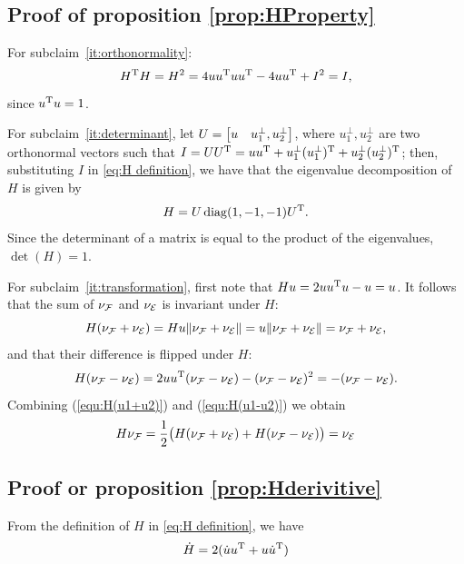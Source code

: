 \documentclass[10pt,twocolumn,twoside]{IEEEtran}
\begin{document}
\appendix
\subsection{Proof of proposition \ref{prop:HProperty}} \label{proof:HProperty}
    For subclaim~\ref{it:orthonormality}:
    \begin{equation}
      H^\mathrm{T} H=H^2=4uu^\mathrm{T} u u^\mathrm{T} - 4uu^\mathrm{T} +I^2=I,
    \end{equation}
    since $u^\mathrm{T} u=1$.

    For subclaim~\ref{it:determinant}, let $U=\begin{bmatrix}u & u^\bot_{1},u^\bot_{2}\end{bmatrix}$, where $u^\bot_{1},u^\bot_{2}$ are two orthonormal vectors such that $I=UU^\mathrm{T}=uu^\mathrm{T} + u^\bot_{1}(u^\bot_{1})^\mathrm{T}+u^\bot_{2}(u^\bot_{2})^\mathrm{T}$; then, substituting $I$ in \eqref{eq:H definition}, we have that the eigenvalue decomposition of $H$ is given by
    \begin{equation}
      H=U\operatorname{diag}(1,-1,-1) U^\mathrm{T}.
    \end{equation}
    Since the determinant of a matrix is equal to the product of the eigenvalues, $\det(H)=1$.

    For subclaim~\ref{it:transformation}, first note that $Hu=2uu^\mathrm{T} u - u=u$.
    It follows that the sum of $\nu_{\mathcal{F}}$ and $\nu_{\mathcal{E}}$ is invariant under $H$:
    \begin{equation}\label{equ:H(u1+u2)}
      H(\nu_{\mathcal{F}}+\nu_{\mathcal{E}})=H u \lVert\nu_{\mathcal{F}}+\nu_{\mathcal{E}}\rVert
      = u\lVert\nu_{\mathcal{F}}+\nu_{\mathcal{E}}\rVert =\nu_{\mathcal{F}}+\nu_{\mathcal{E}},
    \end{equation}
    and that their difference is flipped under $H$:
    \begin{equation}\label{equ:H(u1-u2)}
      H(\nu_{\mathcal{F}}-\nu_{\mathcal{E}}) = 2uu^\mathrm{T} (\nu_{\mathcal{F}}-\nu_{\mathcal{E}}) - (\nu_{\mathcal{F}}-\nu_{\mathcal{E}})^2 = -(\nu_{\mathcal{F}}-\nu_{\mathcal{E}}).
    \end{equation}
    Combining (\ref{equ:H(u1+u2)}) and (\ref{equ:H(u1-u2)}) we obtain
    \begin{equation}
      H\nu_{\mathcal{F}} = \frac{1}{2}\bigl(H(\nu_{\mathcal{F}}+\nu_{\mathcal{E}})+H(\nu_{\mathcal{F}}-\nu_{\mathcal{E}})\bigr)
      = \nu_{\mathcal{E}}
    \end{equation}

\subsection{Proof or proposition \ref{prop:Hderivitive}} \label{proof:Hderivitive}
    From the definition of $H$ in \eqref{eq:H definition}, we have
    \begin{equation} \label{equ:H_dot original}
      \dot H =   2(\dot u u^\mathrm{T} + u \dot u^\mathrm{T})
    \end{equation}
\end{document}
